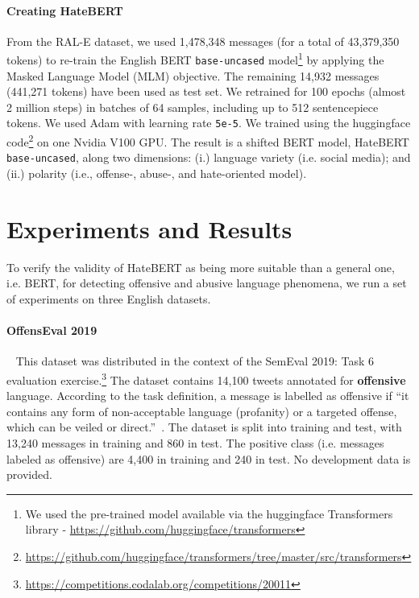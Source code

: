\documentclass[11pt]{article}
\begin{document}
\paragraph{Creating HateBERT} From the RAL-E dataset, we used 1,478,348 messages (for a total of 43,379,350 tokens) to re-train the English BERT \texttt{base-uncased} model\footnote{We used the pre-trained model available via the huggingface Transformers library - \url{https://github.com/huggingface/transformers} } by applying the Masked Language Model (MLM) objective. The remaining 14,932 messages (441,271 tokens) have been used as test set. We retrained for 100 epochs (almost 2 million steps) in batches of 64 samples, including up to 512 sentencepiece tokens. We used Adam with learning rate \texttt{5e-5}. We trained using the huggingface code\footnote{\url{https://github.com/huggingface/transformers/tree/master/src/transformers}} on one Nvidia V100 GPU. The result is a shifted BERT model, HateBERT \texttt{base-uncased}, along two dimensions: (i.) language variety (i.e. social media); and (ii.) polarity (i.e., offense-, abuse-, and hate-oriented model).

\section{Experiments and Results}
\label{sec:experiments}

To verify the validity of HateBERT as being more suitable than a general one, i.e. BERT, for detecting offensive and abusive language phenomena, we run a set of experiments on three English datasets.

\paragraph{OffensEval 2019}~\cite{zampieri-etal-2019-semeval} This dataset was distributed in the context of the SemEval 2019: Task 6 evaluation exercise.\footnote{\url{https://competitions.codalab.org/competitions/20011}} The dataset contains 14,100 tweets annotated for \textbf{offensive} language. According to the task definition, a message is labelled as offensive if ``it contains any form of non-acceptable language (profanity) or a targeted offense, which can be veiled or direct.''~\cite[pg. 76]{zampieri-etal-2019-semeval}. The dataset is split into training and test, with 13,240 messages in training and 860 in test. The positive class (i.e. messages labeled as offensive) are 4,400 in training and 240 in test. No development data is provided.
\end{document}
